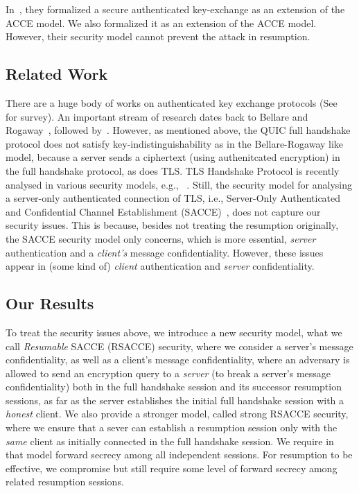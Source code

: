 In~\cite{LJBN15:QUIC}, they formalized a secure
authenticated key-exchange as an extension of the ACCE
model.
We also formalized it as an extension of the ACCE model.
However, their security model cannot prevent the attack
in resumption.

\subsection{Related Work} \label{sec:Related Work}
There are a huge body of works on authenticated key
exchange protocols (See~\cite{CK01:AKE} for survey).
An important stream of research dates back to Bellare
and Rogaway~\cite{BR93:AKE}, followed by~\cite{DB96,
Blei98,JMDP00,JB02,EK09,KK05:TLS,KCRE08,SMOAJ08,KTT11,
Kraw01}.
However, as mentioned above, the QUIC full handshake
protocol does not satisfy key-indistinguishability as
in the Bellare-Rogaway like model, because a server
sends a ciphertext (using authenitcated encryption) in
the full handshake protocol, as does TLS.
TLS Handshake Protocol is recently analysed in various
security models, e.g., ~\cite{JKSS12:ACCE,KPW13:SACCE,
FS13:ACCE,GKS13:RACCE,BDKSS14:SSH,BFKPSB14:TLS}.
Still, the security model for analysing a server-only
authenticated connection of TLS, i.e., Server-Only
Authenticated and Confidential Channel Establishment
(SACCE)~\cite{KPW13:SACCE}, does not capture our
security issues.
This is because, besides not treating the resumption
originally, the SACCE security model only concerns,
which is more essential, \textit{server} authentication
and a \textit{client's} message confidentiality.
However, these issues appear in (some kind of)
\textit{client} authentication and \textit{server}
confidentiality.

\subsection{Our Results} \label{sec:proposal}

To treat the security issues above, we introduce a new
security model, what we call \textit{Resumable} SACCE
(RSACCE) security, where we consider a server's message
confidentiality, as well as a client's message
confidentiality, where an adversary is allowed to send
an encryption query to a \textit{server} (to break a
server's message confidentiality) both in the full
handshake session and its successor resumption sessions,
as far as the server establishes the initial full
handshake session with a \textit{honest} client.
We also provide a stronger model, called strong RSACCE
security, where we ensure that a sever can establish a
resumption session only with the \textit{same} client
as initially connected in the full handshake session.
We require in that model forward secrecy among all
independent sessions.
For resumption to be effective, we compromise but still
require some level of forward secrecy among related
resumption sessions.

